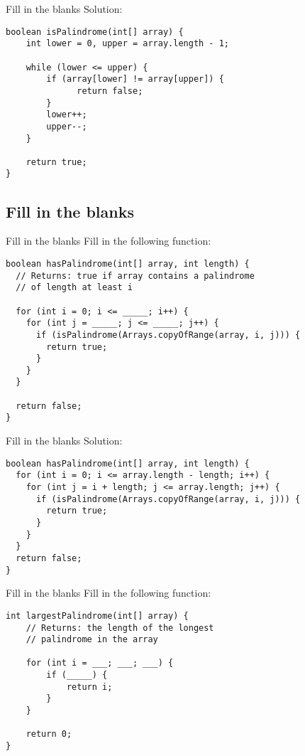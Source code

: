 \documentclass[9pt]{beamer}
\begin{document}
\begin{frame}[fragile]{Fill in the blanks}
  Solution:
  \begin{lstlisting}
boolean isPalindrome(int[] array) {
    int lower = 0, upper = array.length - 1;

    while (lower <= upper) {
        if (array[lower] != array[upper]) {
              return false;
        }
        lower++;
        upper--;
    }

    return true;
}
  \end{lstlisting}
\end{frame}

\subsection{Fill in the blanks}
\begin{frame}[fragile]{Fill in the blanks}
  Fill in the following function:
  \begin{lstlisting}[xleftmargin=-10pt]
boolean hasPalindrome(int[] array, int length) {
  // Returns: true if array contains a palindrome
  // of length at least i

  for (int i = 0; i <= _____; i++) {
    for (int j = _____; j <= _____; j++) {
      if (isPalindrome(Arrays.copyOfRange(array, i, j))) {
        return true;
      }
    }
  }

  return false;
}
  \end{lstlisting}
\end{frame}

\begin{frame}[fragile]{Fill in the blanks}
  Solution:
  \begin{lstlisting}[xleftmargin=-10pt]
boolean hasPalindrome(int[] array, int length) {
  for (int i = 0; i <= array.length - length; i++) {
    for (int j = i + length; j <= array.length; j++) {
      if (isPalindrome(Arrays.copyOfRange(array, i, j))) {
        return true;
      }
    }
  }
  return false;
}
  \end{lstlisting}
\end{frame}

\begin{frame}[fragile]{Fill in the blanks}
  Fill in the following function:
  \begin{lstlisting}
int largestPalindrome(int[] array) {
    // Returns: the length of the longest
    // palindrome in the array

    for (int i = ___; ___; ___) {
        if (_____) {
            return i;
        }
    }

    return 0;
}
  \end{lstlisting}
\end{frame}
\end{document}
